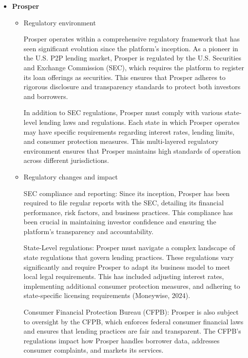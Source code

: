 \documentclass{article}
\begin{document}
\begin{itemize}
\begin{itemize}
    \end{itemize}

    \item \textbf{Prosper}
    \begin{itemize}
        \item Regulatory environment

        Prosper operates within a comprehensive regulatory framework that has seen significant evolution since the platform's inception. As a pioneer in the U.S. P2P lending market, Prosper is regulated by the U.S. Securities and Exchange Commission (SEC), which requires the platform to register its loan offerings as securities. This ensures that Prosper adheres to rigorous disclosure and transparency standards to protect both investors and borrowers.
        
        In addition to SEC regulations, Prosper must comply with various state-level lending laws and regulations. Each state in which Prosper operates may have specific requirements regarding interest rates, lending limits, and consumer protection measures. This multi-layered regulatory environment ensures that Prosper maintains high standards of operation across different jurisdictions.

        \item Regulatory changes and impact
        
        SEC compliance and reporting: Since its inception, Prosper has been required to file regular reports with the SEC, detailing its financial performance, risk factors, and business practices. This compliance has been crucial in maintaining investor confidence and ensuring the platform's transparency and accountability.
        
        State-Level regulations: Prosper must navigate a complex landscape of state regulations that govern lending practices. These regulations vary significantly and require Prosper to adapt its business model to meet local legal requirements. This has included adjusting interest rates, implementing additional consumer protection measures, and adhering to state-specific licensing requirements (Moneywise, 2024).
        
        Consumer Financial Protection Bureau (CFPB): Prosper is also subject to oversight by the CFPB, which enforces federal consumer financial laws and ensures that lending practices are fair and transparent. The CFPB's regulations impact how Prosper handles borrower data, addresses consumer complaints, and markets its services.
        

\end{itemize}
\end{itemize}
\end{document}
